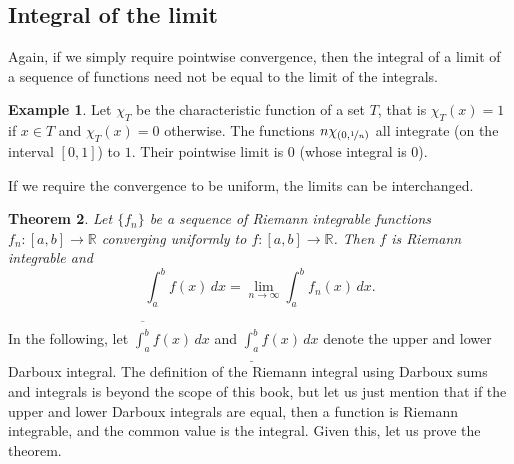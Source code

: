 \documentclass[12pt,openany]{book}
\newcommand{\R}{{\mathbb{R}}}
\theoremstyle{plain}
\newtheorem{thm}{Theorem}[section]
\theoremstyle{remark}
\theoremstyle{definition}
\theoremstyle{exercise}
\theoremstyle{example}
\newtheorem{example}[thm]{Example}
\begin{document}
\subsection{Integral of the limit}

Again, if we simply require pointwise convergence, then the integral
of a limit of a sequence of functions need not be equal to the limit
of the integrals.

\begin{example}
Let $\chi_{T}$ be the characteristic function of a set $T$, that is $\chi_T(x) =
1$ if $x \in T$ and $\chi_T(x) = 0$ otherwise.
The functions $n \chi_{(0,\nicefrac{1}{n})}$ all integrate (on the interval
$[0,1]$) to $1$.  Their
pointwise limit is $0$ (whose integral is $0$).
\end{example}

If we require the convergence to be uniform, the limits can
be interchanged.

\begin{thm} \label{integralinterchange:thm}
Let $\{ f_n \}$ be a sequence of Riemann integrable
functions
$f_n \colon [a,b] \to \R$
converging uniformly to $f \colon [a,b]
\to \R$.  Then $f$ is Riemann integrable and
\begin{equation*}
\int_a^b f(x) \, dx = \lim_{n\to\infty} \int_a^b f_n(x) \, dx .
\end{equation*}
\end{thm}

In the following, let 
$\overline{\int_a^b} f(x)\, dx$ and 
$\underline{\int_a^b} f(x)\, dx$ denote the upper and lower Darboux integral.
The definition of the Riemann integral using Darboux sums and integrals is
beyond the scope of this book, but let us just mention that 
if the upper and lower Darboux integrals are equal, then a function is
Riemann integrable, and the common value is the integral.  Given this,
let us prove the theorem.
\end{document}
